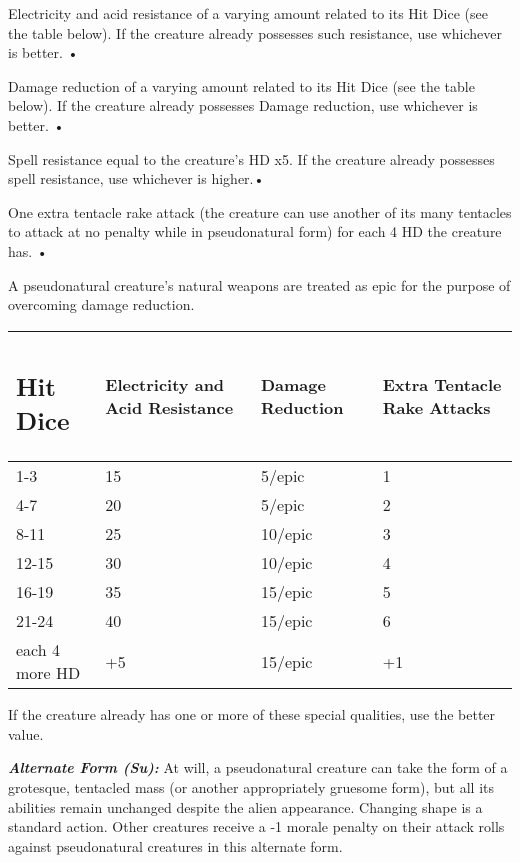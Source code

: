 \documentclass{article}
\begin{document}
{\parindent=3pt
Electricity and acid resistance of a varying amount related to its Hit Dice (see 
the table below). If the creature already possesses such resistance, use whichever 
is better. • 

Damage reduction of a varying amount related to its Hit Dice (see the table below). 
If the creature already possesses Damage reduction, use whichever is better. • 

\parindent=7pt
Spell resistance equal to the creature's HD x5. If the creature already possesses 
spell resistance, use whichever is higher.• 

\parindent=3pt
One extra tentacle rake attack (the creature can use another of its many tentacles 
to attack at no penalty while in pseudonatural form) for each 4 HD the creature 
has. • 

A pseudonatural creature's natural weapons are treated as epic for the purpose 
of overcoming damage reduction.

\vspace{12pt}
\parindent=0pt
\begin{tabular}{|>{\raggedright}p{51pt}|>{\raggedright}p{98pt}|>{\raggedright}p{61pt}|>{\raggedright}p{91pt}|}
\hline
\subsection*{H\textbf{it Dice}} & E\textbf{lectricity and Acid Resistance} & D\textbf{amage 
Reduction} & E\textbf{xtra Tentacle Rake Attacks}\tabularnewline
\hline
1-3 & 15 & 5/epic & 1\tabularnewline
\hline
4-7 & 20 & 5/epic & 2\tabularnewline
\hline
8-11 & 25 & 10/epic & 3\tabularnewline
\hline
12-15 & 30 & 10/epic & 4\tabularnewline
\hline
16-19 & 35 & 15/epic & 5\tabularnewline
\hline
21-24 & 40 & 15/epic & 6\tabularnewline
\hline
each 4 more HD & +5 & 15/epic & +1\tabularnewline
\hline
\end{tabular}

\vspace{12pt}
If the creature already has one or more of these special qualities, use the better 
value. 

\textit{\textbf{Alternate Form (Su):}}\textit{ }At will, a pseudonatural creature 
can take the form of a grotesque, tentacled mass (or another appropriately gruesome 
form), but all its abilities remain unchanged despite the alien appearance. Changing 
shape is a standard action. Other creatures receive a -1 morale penalty on their 
attack rolls against pseudonatural creatures in this alternate form. 

}
\end{document}
